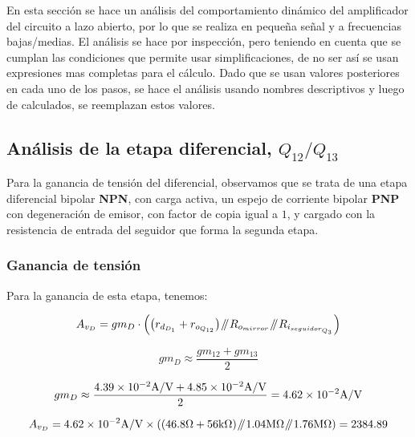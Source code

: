 
En esta sección se hace un análisis del comportamiento dinámico del amplificador del circuito a lazo abierto, por lo que se realiza en pequeña señal y a frecuencias bajas/medias.
El análisis se hace por inspección, pero teniendo en cuenta que se cumplan las condiciones que permite usar simplificaciones, de no ser así se usan expresiones mas completas para el cálculo. Dado que se usan valores posteriores en cada uno de los pasos, se hace el análisis usando nombres descriptivos y luego de calculados, se reemplazan estos valores.

\subsection{Análisis de la etapa diferencial, $Q_{12}/Q_{13}$}

Para la ganancia de tensión del diferencial, observamos que se trata de una etapa diferencial bipolar \textbf{NPN}, con carga activa, un espejo de corriente bipolar \textbf{PNP} con degeneración de emisor, con factor de copia igual a $1$, y cargado con la resistencia de entrada del seguidor que forma la segunda etapa.\\

\subsubsection{Ganancia de tensión}

Para la ganancia de esta etapa, tenemos:

\begin{equation}
A_{v_{D}} = gm_{D} \cdot \left( \left(  r_{d_{D_{1}}} + r_{o_{Q_{12}}} \right) \parallelresistors  R_{o_{mirror}} \parallelresistors R_{i_{seguidor_{Q_{3}}}} \right)
\end{equation}


\begin{equation}
gm_{D} \approx \frac{gm_{12} + gm_{13}}{2}
\end{equation}


\begin{equation*}
gm_{D} \approx \frac{\num{4.39E-2} \si[per-mode=symbol]{\ampere\per\volt} + \num{4.85E-2} \si[per-mode=symbol]{\ampere\per\volt}}{2} = \num{4.62e-2} \si[per-mode=symbol]{\ampere\per\volt}
\end{equation*}


\begin{equation*}
A_{v_{D}} = \num{4.62e-2} \si[per-mode=symbol]{\ampere\per\volt} \times \left( \left( 46.8 \si[per-mode=symbol]{\ohm}  + 56 \si[per-mode=symbol]{\kilo\ohm} \right) \parallelresistors 1.04 \si[per-mode=symbol]{\mega\ohm} \parallelresistors 1.76 \si[per-mode=symbol]{\mega\ohm}  \right) = 2384.89
\end{equation*}

